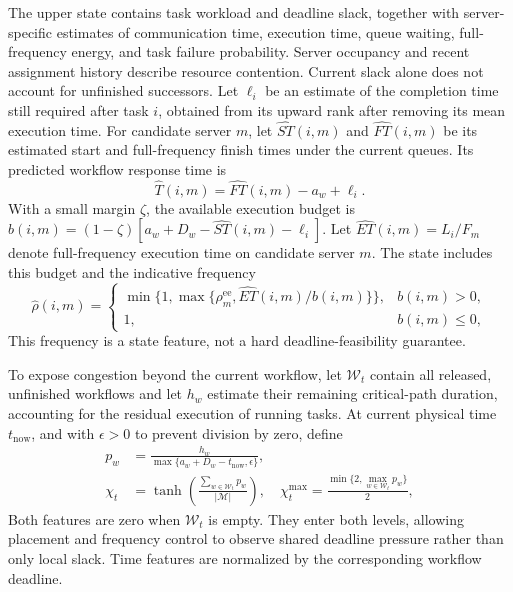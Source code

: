 \documentclass[lettersize,journal]{IEEEtran}
\begin{document}
The upper state contains task workload and deadline slack, together with
server-specific estimates of communication time, execution time, queue
waiting, full-frequency energy, and task failure probability. Server
occupancy and recent assignment history describe resource contention.
Current slack alone does not account for unfinished successors. Let
$\ell_i$ be an estimate of the completion time still required after task
$i$, obtained from its upward rank after removing its mean execution
time. For candidate
server $m$, let $\widehat{ST}(i,m)$ and $\widehat{FT}(i,m)$ be its
estimated start and full-frequency finish times under the current queues.
Its predicted workflow response time is
\begin{equation}
 \widehat T(i,m)=\widehat{FT}(i,m)-a_w+\ell_i.
 \label{eq:method_predicted_finish}
\end{equation}
With a small margin $\zeta$, the available execution budget is
$b(i,m)=(1-\zeta)[a_w+D_w-\widehat{ST}(i,m)-\ell_i]$.
Let $\widehat{ET}(i,m)=L_i/F_m$ denote full-frequency execution time on candidate
server $m$. The state includes this budget and the indicative frequency
\begin{equation}
 \widehat\rho(i,m)=
 \begin{cases}
 \min\{1,\max\{\rho_m^{\mathrm{ee}},\widehat{ET}(i,m)/b(i,m)\}\},&b(i,m)>0,\\
 1,&b(i,m)\leq0,
 \end{cases}
 \label{eq:method_time_frequency}
\end{equation}
This frequency is a state feature, not a hard deadline-feasibility
guarantee.

To expose congestion beyond the current workflow, let $\mathcal W_t$
contain all released, unfinished workflows and let $h_w$ estimate their
remaining critical-path duration, accounting for the residual execution
of running tasks. At current physical time $t_{\mathrm{now}}$, and with
$\epsilon>0$ to prevent division by zero, define
\begin{align}
 p_w&=\frac{h_w}{\max\{a_w+D_w-t_{\mathrm{now}},\epsilon\}},\nonumber\\
 \chi_t&=\tanh\!\left(\frac{\sum_{w\in\mathcal W_t}p_w}{|\mathcal M|}\right),\quad
 \chi_t^{\max}=\frac{\min\{2,\max_{w\in\mathcal W_t}p_w\}}{2},
 \label{eq:method_global_pressure}
\end{align}
Both features are zero when $\mathcal W_t$ is empty. They enter both levels,
allowing placement and frequency control to observe shared deadline
pressure rather than only local slack. Time features are normalized by
the corresponding workflow deadline.
\end{document}
